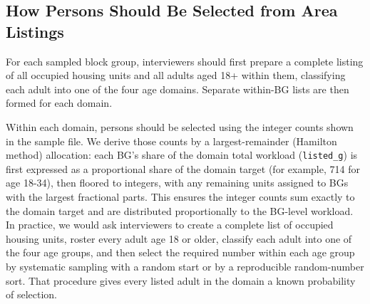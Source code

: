 \documentclass[
  11pt,
  letterpaper,
  DIV=11,
  numbers=noendperiod]{scrartcl}
\begin{document}
\begin{table}[!h]
\centering
\caption{\label{tab:sample-probability-summary}Summary of Selection Probabilities and Workload}
\centering
{}
\end{table}

\subsection{How Persons Should Be Selected from Area
Listings}\label{how-persons-should-be-selected-from-area-listings}

For each sampled block group, interviewers should first prepare a
complete listing of all occupied housing units and all adults aged 18+
within them, classifying each adult into one of the four age domains.
Separate within-BG lists are then formed for each domain.

Within each domain, persons should be selected using the integer counts
shown in the sample file. We derive those counts by a largest-remainder
(Hamilton method) allocation: each BG's share of the domain total
workload (\texttt{listed\_g}) is first expressed as a proportional share
of the domain target (for example, 714 for age 18-34), then floored to
integers, with any remaining units assigned to BGs with the largest
fractional parts. This ensures the integer counts sum exactly to the
domain target and are distributed proportionally to the BG-level
workload. In practice, we would ask interviewers to create a complete
list of occupied housing units, roster every adult age 18 or older,
classify each adult into one of the four age groups, and then select the
required number within each age group by systematic sampling with a
random start or by a reproducible random-number sort. That procedure
gives every listed adult in the domain a known probability of selection.
\end{document}
